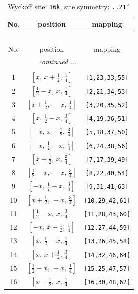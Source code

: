\documentclass[fleqn,8pt]{jsarticle}
\begin{document}
\begin{longtable}{ccc}
\caption{Wyckoff site: {\tt 16k}, site symmetry: {\tt ..21'}}
 \\
 \hline \hline
No. & position & mapping \\ \hline \endfirsthead

\multicolumn{2}{l}{\tablename\ \thetable{}} \\
 \hline \hline
No. & position & mapping \\ \hline \endhead

 \hline \hline
\multicolumn{2}{r}{\footnotesize\it continued ...} \\ \endfoot

 \hline \hline
\multicolumn{2}{r}{} \\ \endlastfoot

1 & $\left[ x,\, x + \frac{1}{2},\, \frac{1}{4} \right]$ & {\tt [1,23,33,55]} \\ \hline
2 & $\left[ \frac{1}{2} - x,\, x,\, \frac{1}{4} \right]$ & {\tt [2,21,34,53]} \\ \hline
3 & $\left[ x + \frac{1}{2},\, - x,\, \frac{1}{4} \right]$ & {\tt [3,20,35,52]} \\ \hline
4 & $\left[ x,\, \frac{1}{2} - x,\, \frac{3}{4} \right]$ & {\tt [4,19,36,51]} \\ \hline
5 & $\left[ - x,\, x + \frac{1}{2},\, \frac{3}{4} \right]$ & {\tt [5,18,37,50]} \\ \hline
6 & $\left[ - x,\, \frac{1}{2} - x,\, \frac{1}{4} \right]$ & {\tt [6,24,38,56]} \\ \hline
7 & $\left[ x + \frac{1}{2},\, x,\, \frac{3}{4} \right]$ & {\tt [7,17,39,49]} \\ \hline
8 & $\left[ \frac{1}{2} - x,\, - x,\, \frac{3}{4} \right]$ & {\tt [8,22,40,54]} \\ \hline
9 & $\left[ - x,\, \frac{1}{2} - x,\, \frac{3}{4} \right]$ & {\tt [9,31,41,63]} \\ \hline
10 & $\left[ x + \frac{1}{2},\, - x,\, \frac{3}{4} \right]$ & {\tt [10,29,42,61]} \\ \hline
11 & $\left[ \frac{1}{2} - x,\, x,\, \frac{3}{4} \right]$ & {\tt [11,28,43,60]} \\ \hline
12 & $\left[ - x,\, x + \frac{1}{2},\, \frac{1}{4} \right]$ & {\tt [12,27,44,59]} \\ \hline
13 & $\left[ x,\, \frac{1}{2} - x,\, \frac{1}{4} \right]$ & {\tt [13,26,45,58]} \\ \hline
14 & $\left[ x,\, x + \frac{1}{2},\, \frac{3}{4} \right]$ & {\tt [14,32,46,64]} \\ \hline
15 & $\left[ \frac{1}{2} - x,\, - x,\, \frac{1}{4} \right]$ & {\tt [15,25,47,57]} \\ \hline
16 & $\left[ x + \frac{1}{2},\, x,\, \frac{1}{4} \right]$ & {\tt [16,30,48,62]} \\
\end{longtable}
\end{document}
